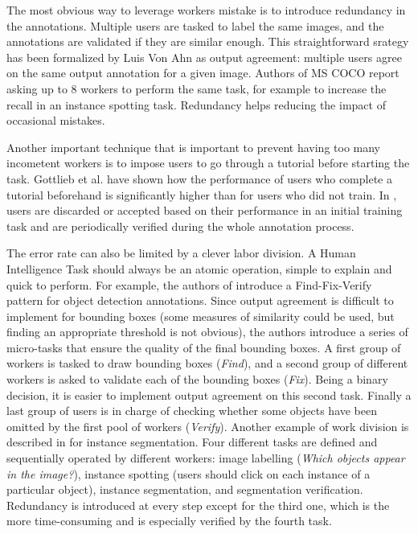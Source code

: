 The most obvious way to leverage workers mistake is to introduce redundancy in the annotations. Multiple users are tasked to label the same images, and the annotations are validated if they are similar enough. This straightforward srategy has been formalized by Luis Von Ahn   \cite{von2008designing} as output agreement: multiple users agree on the same output annotation for a given image. Authors of MS COCO \cite{chen2015microsoft} report asking up to 8 workers to perform the same task, for example to increase the recall in an instance spotting task. Redundancy helps reducing the impact of occasional mistakes. 


Another important technique that is important to prevent having too many incometent workers is to impose users to go through a tutorial before starting the task. Gottlieb et al. \cite{gottlieb2012pushing} have shown how the performance of users who complete a tutorial beforehand is significantly higher than for users who did not train. In \cite{lin2014mscoco}, users are discarded or accepted based on their performance in an initial training task and are periodically verified during the whole annotation process. 


The error rate can also be limited by a clever labor division. A Human Intelligence Task should always be an atomic operation, simple to explain and quick to perform. For example, the authors of \cite{su2012crowdsourcing} introduce a Find-Fix-Verify pattern for object detection annotations. Since output agreement is difficult to implement for bounding boxes (some measures of similarity could be used, but finding an appropriate threshold is not obvious), the authors introduce a series of micro-tasks that ensure the quality of the final bounding boxes. A first group of workers is tasked to draw bounding boxes (\textit{Find}), and a second group of different  workers is asked to validate each of the bounding boxes (\textit{Fix}). Being a binary decision, it is easier to implement output agreement on this second task. Finally a last group of users is in charge of checking whether some objects have been omitted by the first pool of workers (\textit{Verify}). Another example of work division is described in \cite{chen2015microsoft} for instance segmentation. Four different tasks are defined and sequentially operated by different workers: image labelling (\textit{Which objects appear in the image?}), instance spotting (users should click on each instance of a particular object), instance segmentation, and segmentation verification. Redundancy is introduced at every step except for the third one, which is the more time-consuming and is especially verified by the fourth task.  


